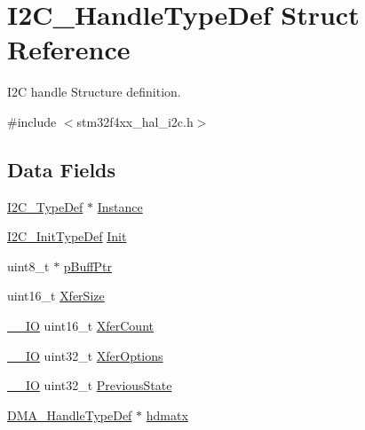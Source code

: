 \hypertarget{struct_i2_c___handle_type_def}{}\section{I2\+C\+\_\+\+Handle\+Type\+Def Struct Reference}
\label{struct_i2_c___handle_type_def}


I2C handle Structure definition.  




{\ttfamily \#include $<$stm32f4xx\+\_\+hal\+\_\+i2c.\+h$>$}

\subsection*{Data Fields}
\begin{DoxyCompactItemize}
\item 
\mbox{\hyperlink{struct_i2_c___type_def}{I2\+C\+\_\+\+Type\+Def}} $\ast$ \mbox{\hyperlink{struct_i2_c___handle_type_def_a8bdec20782b6b99587806437094c43d2}{Instance}}
\item 
\mbox{\hyperlink{struct_i2_c___init_type_def}{I2\+C\+\_\+\+Init\+Type\+Def}} \mbox{\hyperlink{struct_i2_c___handle_type_def_a4b1d65e692a280d15470a8184ed2f68a}{Init}}
\item 
uint8\+\_\+t $\ast$ \mbox{\hyperlink{struct_i2_c___handle_type_def_ae5b117ad14c78eb266b018fb972e315e}{p\+Buff\+Ptr}}
\item 
uint16\+\_\+t \mbox{\hyperlink{struct_i2_c___handle_type_def_a51999331ab800faccdb97383b39819dd}{Xfer\+Size}}
\item 
\mbox{\hyperlink{core__sc300_8h_aec43007d9998a0a0e01faede4133d6be}{\+\_\+\+\_\+\+IO}} uint16\+\_\+t \mbox{\hyperlink{struct_i2_c___handle_type_def_a49bf3cd0e9bcb9f41f161663f513f405}{Xfer\+Count}}
\item 
\mbox{\hyperlink{core__sc300_8h_aec43007d9998a0a0e01faede4133d6be}{\+\_\+\+\_\+\+IO}} uint32\+\_\+t \mbox{\hyperlink{struct_i2_c___handle_type_def_a275aa3c8180a03dbe4bf55fafba3e892}{Xfer\+Options}}
\item 
\mbox{\hyperlink{core__sc300_8h_aec43007d9998a0a0e01faede4133d6be}{\+\_\+\+\_\+\+IO}} uint32\+\_\+t \mbox{\hyperlink{struct_i2_c___handle_type_def_aa74abfd1a56073ae8c2c826db1be0628}{Previous\+State}}
\item 
\mbox{\hyperlink{group___d_m_a___exported___types_ga41b754a906b86bce54dc79938970138b}{D\+M\+A\+\_\+\+Handle\+Type\+Def}} $\ast$ \mbox{\hyperlink{struct_i2_c___handle_type_def_a33e13c28b1a70e6164417abb026d7a22}{hdmatx}}

\end{DoxyCompactItemize}
